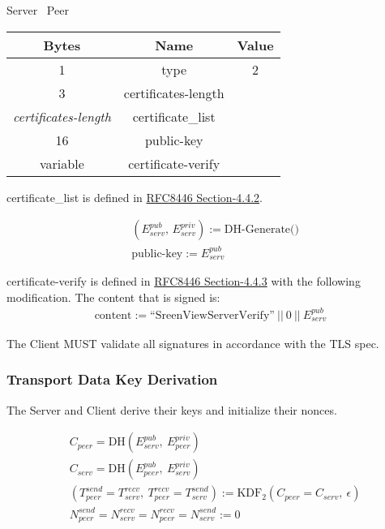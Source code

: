 \begin{center}
    Server \textrightarrow\ Peer\\
    \begin{tabular}{|c|c|c|}
        \hline
        \textbf{Bytes}             & \textbf{Name}       & \textbf{Value} \\
        \hline
        1                          & type                & 2              \\
        \hline
        3                          & certificates-length &                \\
        \hline
        \emph{certificates-length} & certificate\_list   &                \\
        \hline
        16                         & public-key          &                \\
        \hline
        variable                   & certificate-verify  &                \\
        \hline
    \end{tabular}
\end{center}

certificate\_list is defined in \href{https://datatracker.ietf.org/doc/html/rfc8446#section-4.4.2}{RFC8446
Section-4.4.2}.

\begin{align*}
    & (E_{serv}^{pub},\, E_{serv}^{priv}) := \text{DH-Generate()}\\
    & \text{public-key} := E_{serv}^{pub}
\end{align*}

certificate-verify is defined in \href{https://datatracker.ietf.org/doc/html/rfc8446#section-4.4
.3}{RFC8446 Section-4.4.3} with the following modification. The content that is signed is:\\

\begin{align*}
    \text{content} := \text{``SreenViewServerVerify''}\ ||\ 0\ ||\ E_{serv}^{pub}
\end{align*}

The Client MUST validate all signatures in accordance with the TLS spec.

\subsubsection{Transport Data Key Derivation}

The Server and Client derive their keys and initialize their nonces.

\begin{align*}
    & C_{peer} = \text{DH}(E_{serv}^{pub},\ E_{peer}^{priv})\\
    & C_{serv} = \text{DH}(E_{peer}^{pub},\ E_{serv}^{priv})\\
    & (T_{peer}^{send} = T_{serv}^{recv},\ T_{peer}^{recv} = T_{serv}^{send}) := \text{KDF}_2(C_{peer} = C_{serv},
    \ \epsilon) \\
    & N_{peer}^{send} = N_{serv}^{recv} = N_{peer}^{recv} = N_{serv}^{send} := 0
\end{align*}

